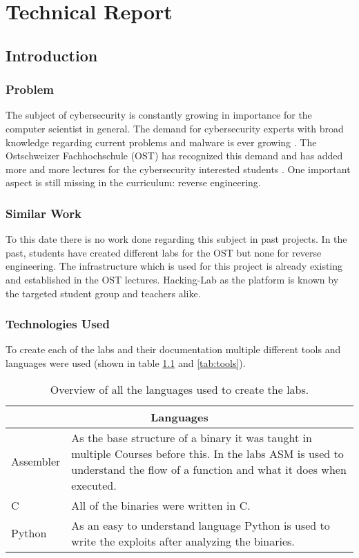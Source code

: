\chapter{Technical Report}
\section{Introduction}
\subsection{Problem}
The subject of cybersecurity is constantly growing in importance for the computer scientist in general. The demand for cybersecurity experts with broad knowledge regarding current problems and malware is ever growing \cite{cybercrime-mag}. The Ostschweizer Fachhochschule (OST) has recognized this demand and has added more and more lectures for the cybersecurity interested students \cite{ost-cybersec}. One important aspect is still missing in the curriculum: reverse engineering.

\subsection{Similar Work}
To this date there is no work done regarding this subject in past projects. In the past, students have created different labs for the OST but none for reverse engineering. The infrastructure which is used for this project is already existing and established in the OST lectures. Hacking-Lab as the platform is known by the targeted student group and teachers alike. 

\subsection{Technologies Used}
To create each of the labs and their documentation multiple different tools and languages were used (shown in table \ref{tab:languages} and \ref{tab:tools}). 
\begin{center}
    \begin{table}[H]
        \centering
        \begin{tabular}{ |p{4.1cm}|p{10cm}| } 
            \hline
            \multicolumn{2}{||c||}{\textbf{Languages}} \\
            \hline
            \hline
                Assembler & As the base structure of a binary it was taught in multiple Courses before this. In the labs ASM is used to understand the flow of a function and what it does when executed. \\
            \hline
                C & All of the binaries were written in C.   \\
            \hline
                Python & As an easy to understand language Python is used to write the exploits after analyzing the binaries. \\
            \hline
        \end{tabular}
        \caption{Overview of all the languages used to create the labs.}
        \label{tab:languages}
    \end{table}
\end{center}

